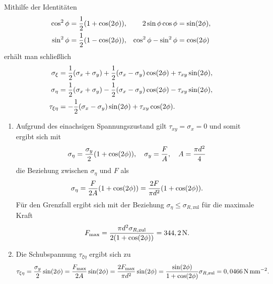 \documentclass{exercise}
\begin{document}
    Mithilfe der Identitäten
    \begin{align*}
        \cos^2\phi &= \frac{1}{2}\parentheses*{1 + \cos\parentheses*{2\phi}}, & 2\sin\phi\cos\phi &= \sin\parentheses*{2\phi},\\
        \sin^2\phi &= \frac{1}{2}\parentheses*{1 - \cos\parentheses*{2\phi}}, & \cos^2\phi - \sin^2\phi &= \cos\parentheses*{2\phi}
    \end{align*}
    erhält man schließlich
    \begin{align*}
        \sigma_\xi &= \frac{1}{2}\parentheses*{\sigma_x + \sigma_y} + \frac{1}{2}\parentheses*{\sigma_x - \sigma_y}\cos\parentheses*{2\phi} + \tau_{xy}\sin\parentheses*{2\phi},\\
        \sigma_\eta &= \frac{1}{2}\parentheses*{\sigma_x + \sigma_y} - \frac{1}{2}\parentheses*{\sigma_x - \sigma_y}\cos\parentheses*{2\phi} - \tau_{xy}\sin\parentheses*{2\phi},\\
        \tau_{\xi\eta} &= -\frac{1}{2}\parentheses*{\sigma_x - \sigma_y}\sin\parentheses*{2\phi} + \tau_{xy}\cos\parentheses*{2\phi}.
    \end{align*}
    \begin{enumerate}
        \item Aufgrund des einachsigen Spannungszustand gilt \(\tau_{xy} = \sigma_x = 0\) und somit ergibt sich mit
        \[
            \sigma_\eta = \frac{\sigma_y}{2}\parentheses*{1 + \cos\parentheses*{2\phi}}, \quad \sigma_y = \frac{F}{A}, \quad A = \frac{\pi d^2}{4}
        \]
        die Beziehung zwischen \(\sigma_\eta\) und \(F\) als
        \[
            \sigma_\eta = \frac{F}{2A}\parentheses*{1 + \cos\parentheses*{2\phi}} = \frac{2F}{\pi d^2}\parentheses*{1 + \cos\parentheses*{2\phi}}.
        \]
        Für den Grenzfall ergibt sich mit der Beziehung \(\sigma_\eta \le \sigma_{R, \text{zul}}\) für die maximale Kraft
        \[
            F_{\text{max}} = \frac{\pi d^2\sigma_{R, \text{zul}}}{2\parentheses*{1 + \cos\parentheses*{2\phi}}} = 344,2\sis{\newton}.
        \]
        \item Die Schubspannung \(\tau_{\xi\eta}\) ergibt sich zu
        \[
            \tau_{\xi\eta} = \frac{\sigma_y}{2}\sin\parentheses*{2\phi} = \frac{F_{\text{max}}}{2A}\sin\parentheses*{2\phi} = \frac{2F_{\text{max}}}{\pi d^2}\sin\parentheses*{2\phi} = \frac{\sin\parentheses*{2\phi}}{1 + \cos\parentheses*{2\phi}}\sigma_{R, \text{zul}} = 0,0466\sis{\newton\per\milli\meter\squared}.
        \]
    \end{enumerate}
\end{document}
